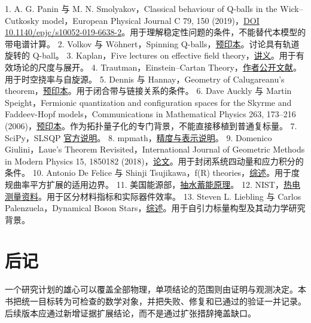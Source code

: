 \documentclass[UTF8,fontset=fandol,11pt]{ctexart}
\begin{document}
1. A. G. Panin 与 M. N. Smolyakov，Classical behaviour of Q-balls in the Wick–Cutkosky model，European Physical Journal C 79, 150 (2019)，\href{https://link.springer.com/article/10.1140/epjc/s10052-019-6638-2}{DOI 10.1140/epjc/s10052-019-6638-2}。用于理解稳定性问题的条件，不能替代本模型的带电谱计算。
2. Volkov 与 Wöhnert，Spinning Q-balls，\href{https://arxiv.org/abs/hep-th/0205157}{预印本}。讨论具有轨道旋转的 Q-ball。
3. Kaplan，Five lectures on effective field theory，\href{https://arxiv.org/abs/nucl-th/0510023}{讲义}。用于有效场论的尺度与展开。
4. Trautman，Einstein–Cartan Theory，\href{https://trautman.fuw.edu.pl/publications/Papers-in-pdf/105.pdf}{作者公开文献}。用于时空挠率与自旋源。
5. Dennis 与 Hannay，Geometry of Calugareanu's theorem，\href{https://arxiv.org/abs/math-ph/0503012}{预印本}。用于闭合带与链接关系的条件。
6. Dave Auckly 与 Martin Speight，Fermionic quantization and configuration spaces for the Skyrme and Faddeev-Hopf models，Communications in Mathematical Physics 263, 173–216 (2006)，\href{https://arxiv.org/abs/hep-th/0411010}{预印本}。作为拓扑量子化的专门背景，不能直接移植到普通复标量。
7. SciPy，SLSQP \href{https://docs.scipy.org/doc/scipy/reference/optimize.minimize-slsqp.html}{官方说明}。
8. mpmath，\href{https://www.mpmath.org/doc/current/technical.html}{精度与表示说明}。
9. Domenico Giulini，Laue's Theorem Revisited，International Journal of Geometric Methods in Modern Physics 15, 1850182 (2018)，\href{https://arxiv.org/abs/1808.09320}{论文}。用于封闭系统四动量和应力积分的条件。
10. Antonio De Felice 与 Shinji Tsujikawa，f(R) theories，\href{https://arxiv.org/abs/1002.4928}{综述}。用于度规曲率平方扩展的适用边界。
11. 美国能源部，\href{https://www.energy.gov/cmei/water/how-pumped-storage-hydropower-works}{抽水蓄能原理}。
12. NIST，\href{https://tsapps.nist.gov/publication/get_pdf.cfm?pub_id=956623}{热电测量资料}。用于区分材料指标和实际器件效率。
13. Steven L. Liebling 与 Carlos Palenzuela，Dynamical Boson Stars，\href{https://arxiv.org/abs/1202.5809}{综述}。用于自引力标量构型及其动力学研究背景。

\section*{后记}

一个研究计划的雄心可以覆盖全部物理，单项结论的范围则由证明与观测决定。本书把统一目标转为可检查的数学对象，并把失败、修复和已通过的验证一并记录。后续版本应通过新增证据扩展结论，而不是通过扩张措辞掩盖缺口。
\end{document}
